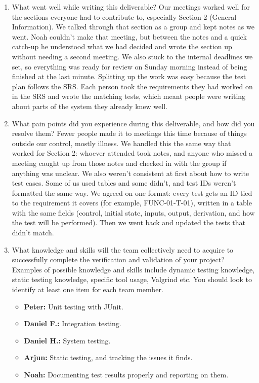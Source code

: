 \documentclass[12pt, titlepage]{article}
\begin{document}
\begin{enumerate}
  \item What went well while writing this deliverable? \newline
  Our meetings worked well for the sections everyone had to contribute to,
  especially Section 2 (General Information). We talked through that section as
  a group and kept notes as we went. Noah couldn't make that meeting, but between
  the notes and a quick catch-up he understood what we had decided and wrote the
  section up without needing a second meeting. \newline
  We also stuck to the internal deadlines we set, so everything was ready for
  review on Sunday morning instead of being finished at the last minute. \newline
  Splitting up the work was easy because the test plan follows the SRS. Each
  person took the requirements they had worked on in the SRS and wrote the
  matching tests, which meant people were writing about parts of the system they
  already knew well.

  \item What pain points did you experience during this deliverable, and how
    did you resolve them? \newline
  Fewer people made it to meetings this time because of things outside our
  control, mostly illness. We handled this the same way that worked for Section
  2: whoever attended took notes, and anyone who missed a meeting caught up from
  those notes and checked in with the group if anything was unclear. \newline
  We also weren't consistent at first about how to write test cases. Some of us
  used tables and some didn't, and test IDs weren't formatted the same way. We
  agreed on one format: every test gets an ID tied to the requirement it covers
  (for example, FUNC-01-T-01), written in a table with the same fields (control,
  initial state, inputs, output, derivation, and how the test will be performed).
  Then we went back and updated the tests that didn't match.

  \item What knowledge and skills will the team collectively need to acquire to
  successfully complete the verification and validation of your project?
  Examples of possible knowledge and skills include dynamic testing knowledge,
  static testing knowledge, specific tool usage, Valgrind etc.  You should look to
  identify at least one item for each team member. \newline
  \begin{itemize}
    \item \textbf{Peter:} Unit testing with JUnit.
    \item \textbf{Daniel F.:} Integration testing.
    \item \textbf{Daniel H.:} System testing.
    \item \textbf{Arjun:} Static testing, and tracking the issues it finds.
    \item \textbf{Noah:} Documenting test results properly and reporting on them.
  \end{itemize}


\end{enumerate}
\end{document}
